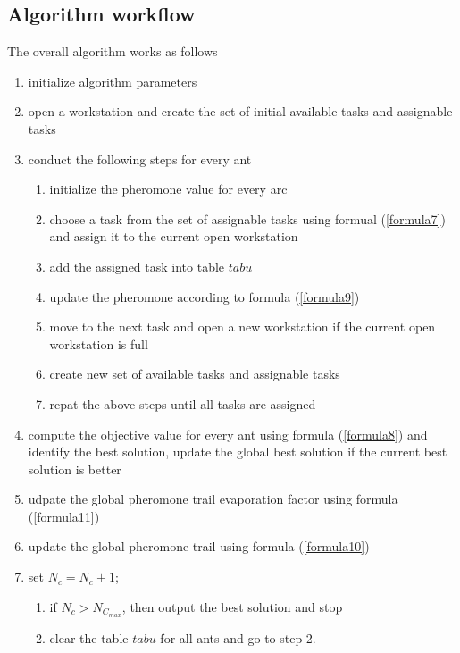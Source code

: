 \subsection{Algorithm workflow}
The overall algorithm works as follows
\begin{enumerate}
	\item initialize algorithm parameters
	\item open a workstation and create the set of initial available tasks and assignable tasks
	\item conduct the following steps for every ant
	\begin{enumerate}
		\item initialize the pheromone value for every arc
		\item choose a task from the set of assignable tasks using formual (\ref{formula7}) and assign it to the current open workstation
		\item add the assigned task into table $tabu$
		\item update the pheromone according to formula (\ref{formula9})
		\item move to the next task and open a new workstation if the current open workstation is full
		\item create new set of available tasks and assignable tasks
		\item repat the above steps until all tasks are assigned
	\end{enumerate}
	\item compute the objective value for every ant using formula (\ref{formula8}) and identify the best solution, update the global best solution if the current best solution is better
	\item udpate the global pheromone trail evaporation factor using formula (\ref{formula11})
	\item update the global pheromone trail using formula (\ref{formula10})
	\item set $N_c = N_c + 1$; 
	\begin{enumerate}
		\item if $N_c > N_{C_{max}}$, then output the best solution and stop
		\item clear the table $tabu$ for all ants and go to step 2.
	\end{enumerate}
\end{enumerate}
